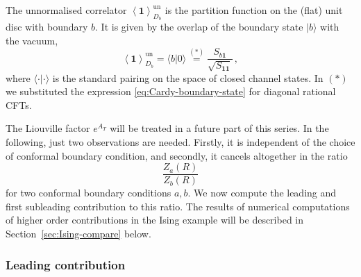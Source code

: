 \documentclass[11pt,a4paper]{article}
\numberwithin{equation}{section}
\def\ket#1{|{#1}\rangle}
\newcommand{\one}{\mathbf{1}} %
\begin{document}
\noindent
The unnormalised correlator $\left\langle\one\right\rangle_{D_b}^\mathrm{un}$ is the partition function on the (flat) unit disc with boundary $b$. 
It is given by the overlap of the boundary state $\ket{b}$ with the vacuum, 
%
\begin{equation}\label{eq:disc-unnorm}
    \left\langle\one\right\rangle_{D_b}^\mathrm{un} = 
    \langle b \ket{0}
    \overset{(*)}= \frac{S_{b\one}}{\sqrt{S_{\one\one}}}
    \,,
\end{equation}
%
where $\langle\cdot\vert\cdot\rangle$ is the standard pairing on the space of closed channel states. 
In $(*)$ we substituted the expression \eqref{eq:Cardy-boundary-state} for diagonal rational CFTs.

The Liouville factor $e^{A_T}$ will be treated in a future part of this series. 
In the following, just two observations are needed. Firstly, it is independent of the choice of conformal boundary condition, and secondly, it cancels altogether in the ratio 
%
\begin{equation}\label{eq:ZaZb-ratio}
    \frac{Z_a(R)}{Z_b(R)}
\end{equation}
%
for two conformal boundary conditions $a,b$. We now compute the leading and first subleading contribution to this ratio. The results of numerical computations of higher order contributions in the Ising example will be described in Section~\ref{sec:Ising-compare} below.

\subsubsection{Leading contribution}
\end{document}
